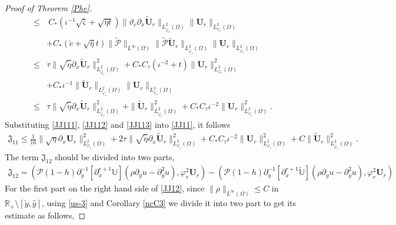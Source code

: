 \documentclass{amsart}
\numberwithin{equation}{section}
\begin{document}
\begin{proof}[Proof of Theorem \ref{Phe}]
\begin{align}
\leq&~C_{*}(\iota^{-1}\sqrt{\bar{\varsigma}}+\sqrt{\bar{\eta}t})
           \|\vartheta_{c}\partial_{x}\tilde{\mathbf{U}}_{r}\|_{L_{\tilde{\varphi}_{r}}^{2}(\Omega)}\|\mathbf{U}_{r}\|_{L_{\varphi_{r}}^{2}(\Omega)}\nonumber\\
    &+C_{*}(\check{c}+\sqrt{\bar{\eta}}t)\|\tilde{\mathcal{P}}\|_{L^{\infty}(\Omega)}
           \|\tilde{\mathcal{P}}\tilde{\mathbf{U}}_{r}\|_{L_{\tilde{\varphi}_{r}}^{2}(\Omega)}\|\mathbf{U}_{r}\|_{L_{\varphi_{r}}^{2}(\Omega)}\nonumber\\
\leq& \tau\|\sqrt{\tilde{\eta}}\partial_{x}\tilde{\mathbf{U}}_{r}\|_{L_{\tilde{\varphi}_{r}}^{2}(\Omega)}^{2}
     +C_{*}C_{\tau}(\iota^{-2}+t)\|\mathbf{U}_{r}\|_{L_{\varphi_{r}}^{2}(\Omega)}^{2}\nonumber\\
    &+C_{*}\iota^{-1}\|\tilde{\mathbf{U}}_{r}\|_{L_{\tilde{\varphi}_{r}}^{2}(\Omega)}\|\mathbf{U}_{r}\|_{L_{\varphi_{r}}^{2}(\Omega)}\nonumber\\
\leq& \tau\|\sqrt{\tilde{\eta}}\partial_{x}\tilde{\mathbf{U}}_{r}\|_{L_{\tilde{\varphi}_{r}}^{2}(\Omega)}^{2}
     +\|\tilde{\mathbf{U}}_{r}\|_{L_{\tilde{\varphi}_{r}}^{2}(\Omega)}^{2}
     +C_{*}C_{\tau}\iota^{-2}\|\mathbf{U}_{r}\|_{L_{\varphi_{r}}^{2}(\Omega)}^{2}.\nonumber
\end{align}
Substituting \eqref{JJ111}, \eqref{JJ112} and \eqref{JJ113} into \eqref{JJ11}, it follows
\begin{align}\label{JJ11'}
\mathfrak{J}_{11}
\leq \frac{1}{16}\|\sqrt{\eta}\partial_{x}\mathbf{U}_{r}\|_{L_{\varphi_{r}}^{2}(\Omega)}^{2}
    +2\tau\|\sqrt{\tilde{\eta}}\partial_{x}\tilde{\mathbf{U}}_{r}\|_{L_{\varphi_{r}}^{2}(\Omega)}^{2}
    +C_{*}C_{\tau}\iota^{-2}\|\mathbf{U}_{r}\|_{L_{\varphi_{r}}^{2}(\Omega)}^{2}
    +C\|\tilde{\mathbf{U}}_{r}\|_{L_{\tilde{\varphi}_{r}}^{2}(\Omega)}^{2}.
\end{align}
The term $\mathfrak{J}_{12}$ should be divided into two parts,
\begin{align}\label{JJ12}
\mathfrak{J}_{12}
= (\mathcal{P}(1-h)\partial_{y}^{-1}[\partial_{x}^{r+1}\mathbb{U}](\rho\partial_{y}u-\partial_{y}^{2}u),\varphi_{r}^{2}\mathbf{U}_{r})
 -(\mathcal{P}(1-h)\partial_{y}^{-1}[\partial_{x}^{r+1}\tilde{\mathbb{U}}](\rho\partial_{y}u-\partial_{y}^{2}u),\varphi_{r}^{2}\mathbf{U}_{r})
\end{align}
For the first part on the right hand side of \eqref{JJ12}, since
$\|\rho\|_{L^{\infty}(\Omega)}\leq C$ in $\mathbb{R}_{+}\setminus[\check{y},\hat{y}]$,
using \eqref{us-3} and Corollary \ref{ncC3}  we divide it into two part to get its estimate as follows,

\end{proof}
\end{document}
